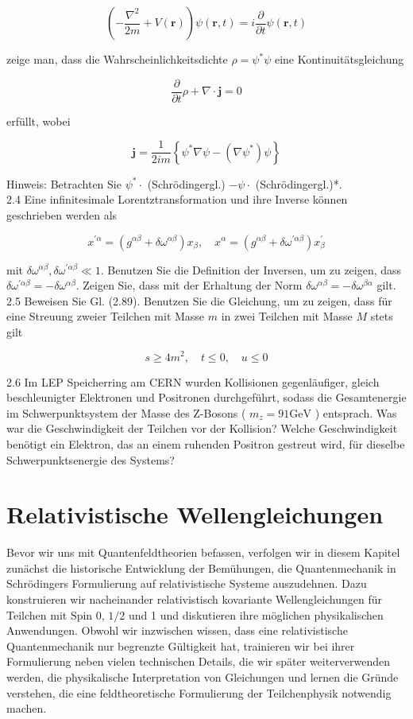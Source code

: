 \documentclass[10pt, letterpaper]{article}
\begin{document}
$$
\left(-\frac{\nabla^{2}}{2 m}+V(\mathbf{r})\right) \psi(\mathbf{r}, t)=i \frac{\partial}{\partial t} \psi(\mathbf{r}, t)
$$

zeige man, dass die Wahrscheinlichkeitsdichte $\rho=\psi^{*} \psi$ eine Kontinuitätsgleichung

$$
\frac{\partial}{\partial t} \rho+\nabla \cdot \mathbf{j}=0
$$

erfüllt, wobei

$$
\mathbf{j}=\frac{1}{2 i m}\left\{\psi^{*} \nabla \psi-\left(\nabla \psi^{*}\right) \psi\right\}
$$

Hinweis: Betrachten Sie $\psi^{*} \cdot$ (Schrödingergl.) $-\psi \cdot$ (Schrödingergl.)*.\\
2.4 Eine infinitesimale Lorentztransformation und ihre Inverse können geschrieben werden als

$$
x^{\prime \alpha}=\left(g^{\alpha \beta}+\delta \omega^{\alpha \beta}\right) x_{\beta}, \quad x^{\alpha}=\left(g^{\alpha \beta}+\delta \omega^{\prime \alpha \beta}\right) x_{\beta}^{\prime}
$$

mit $\delta \omega^{\alpha \beta}, \delta \omega^{\prime \alpha \beta} \ll 1$. Benutzen Sie die Definition der Inversen, um zu zeigen, dass $\delta \omega^{\prime \alpha \beta}=-\delta \omega^{\alpha \beta}$. Zeigen Sie, dass mit der Erhaltung der Norm $\delta \omega^{\alpha \beta}=-\delta \omega^{\beta \alpha}$ gilt.\\
2.5 Beweisen Sie Gl. (2.89). Benutzen Sie die Gleichung, um zu zeigen, dass für eine Streuung zweier Teilchen mit Masse $m$ in zwei Teilchen mit Masse $M$ stets gilt

$$
s \geqslant 4 m^{2}, \quad t \leqslant 0, \quad u \leqslant 0
$$

2.6 Im LEP Speicherring am CERN wurden Kollisionen gegenläufiger, gleich beschleunigter Elektronen und Positronen durchgeführt, sodass die Gesamtenergie im Schwerpunktsystem der Masse des Z-Bosons ( $m_{z}=91 \mathrm{GeV}$ ) entsprach. Was war die Geschwindigkeit der Teilchen vor der Kollision? Welche Geschwindigkeit benötigt ein Elektron, das an einem ruhenden Positron gestreut wird, für dieselbe Schwerpunktsenergie des Systems?


\pagebreak


\section{Relativistische Wellengleichungen}


Bevor wir uns mit Quantenfeldtheorien befassen, verfolgen wir in diesem Kapitel zunächst die historische Entwicklung der Bemühungen, die Quantenmechanik in Schrödingers Formulierung auf relativistische Systeme auszudehnen. Dazu konstruieren wir nacheinander relativistisch kovariante Wellengleichungen für Teilchen mit Spin 0, $1 / 2$ und 1 und diskutieren ihre möglichen physikalischen Anwendungen. Obwohl wir inzwischen wissen, dass eine relativistische Quantenmechanik nur begrenzte Gültigkeit hat, trainieren wir bei ihrer Formulierung neben vielen technischen Details, die wir später weiterverwenden werden, die physikalische Interpretation von Gleichungen und lernen die Gründe verstehen, die eine feldtheoretische Formulierung der Teilchenphysik notwendig machen.
\end{document}
